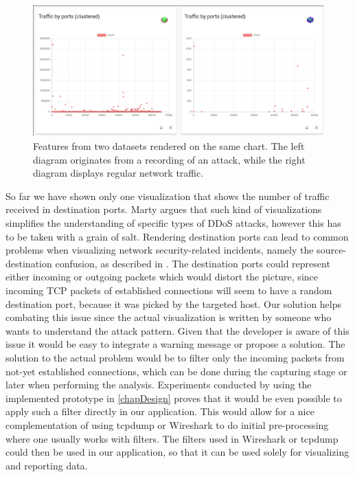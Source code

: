 \begin{figure}[]
    \centering
    \includegraphics[width=15cm]{images/evaluation_different_datasets_same_visualization.png}
    \caption{Features from two datasets rendered on the same chart. The left diagram originates from a recording of an attack, while the right diagram displays regular network traffic.}
    \label{fig:datasettilesop}
\end{figure}
So far we have shown only one visualization that shows the number of traffic received in destination ports.
Marty argues that such kind of visualizations simplifies the understanding of specific types of DDoS attacks, however this has to be taken with a grain of salt. Rendering destination ports can lead to common problems when visualizing network security-related incidents, namely the source-destination confusion, as described in \cite{appliedsecurityvisualization}. The destination ports could represent either incoming or outgoing packets which would distort the picture, since incoming TCP packets of established connections will seem to have a random destination port, because it was picked by the targeted host. Our solution helps combating this issue since the actual visualization is written by someone who wants to understand the attack pattern. Given that the developer is aware of this issue it would be easy to integrate a warning message or propose a solution. The solution to the actual problem would be to filter only the incoming packets from not-yet established connections, which can be done during the capturing stage or later when performing the analysis. Experiments conducted by using the implemented prototype in \ref{chapDesign} proves that it would be even possible to apply such a filter directly in our application. This would allow for a nice complementation of using tcpdump or Wireshark to do initial pre-processing where one usually works with filters. The filters used in Wireshark or tcpdump could then be used in our application, so that it can be used solely for visualizing and reporting data.
